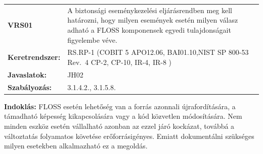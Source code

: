 \documentclass[12pt,magyar,a4paper,oneside]{scrreprt}
\begin{document}
\begin{longtable}[]{@{}ll@{}}
\toprule
\endhead
\begin{minipage}[t]{0.16\columnwidth}\raggedright
\textbf{VRS01}\strut
\end{minipage} & \begin{minipage}[t]{0.79\columnwidth}\raggedright
A biztonsági eseménykezelési eljárásrendben meg kell határozni, hogy
milyen események esetén milyen válasz adható a FLOSS komponensek egyedi
tulajdonságait figyelembe véve.\strut
\end{minipage}\tabularnewline
\begin{minipage}[t]{0.16\columnwidth}\raggedright
\textbf{Keretrendszer:}\strut
\end{minipage} & \begin{minipage}[t]{0.79\columnwidth}\raggedright
RS.RP-1 (COBIT 5 APO12.06, BAI01.10,NIST SP 800-53 Rev.~4 CP-2, CP-10,
IR-4, IR-8 )\strut
\end{minipage}\tabularnewline
\begin{minipage}[t]{0.16\columnwidth}\raggedright
\textbf{Javaslatok:}\strut
\end{minipage} & \begin{minipage}[t]{0.79\columnwidth}\raggedright
JH02\strut
\end{minipage}\tabularnewline
\begin{minipage}[t]{0.16\columnwidth}\raggedright
\textbf{Szabályozás:}\strut
\end{minipage} & \begin{minipage}[t]{0.79\columnwidth}\raggedright
3.1.4.2., 3.1.5.8.\strut
\end{minipage}\tabularnewline
\bottomrule
\end{longtable}

\textbf{Indoklás: } FLOSS esetén lehetőség van a forrás azonnali
újrafordítására, a támadható képesség kikapcsolására vagy a kód
közvetlen módosítására. Nem minden eszköz esetén vállalható azonban az
ezzel járó kockázat, továbbá a változtatás folyamatos követése
erőforrásigényes. Emiatt dokumentálni szükséges milyen esetekben
alkalmazható ez a megoldás.
\end{document}
